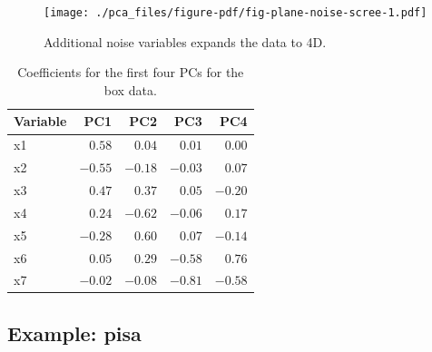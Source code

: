\documentclass[
  letterpaper,
]{book}
\newenvironment{Shaded}{\begin{snugshade}}{\end{snugshade}}
\newcommand{\AttributeTok}[1]{\textcolor[rgb]{0.40,0.45,0.13}{#1}}
\newcommand{\DecValTok}[1]{\textcolor[rgb]{0.68,0.00,0.00}{#1}}
\newcommand{\FunctionTok}[1]{\textcolor[rgb]{0.28,0.35,0.67}{#1}}
\newcommand{\NormalTok}[1]{\textcolor[rgb]{0.00,0.23,0.31}{#1}}
\newcommand{\SpecialCharTok}[1]{\textcolor[rgb]{0.37,0.37,0.37}{#1}}
\newcommand{\StringTok}[1]{\textcolor[rgb]{0.13,0.47,0.30}{#1}}
\begin{document}
\begin{figure}[H]

{\centering \texttt{[image: ./pca\_files/figure-pdf/fig-plane-noise-scree-1.pdf]}

}

\caption{\label{fig-plane-noise-scree}Additional noise variables expands
the data to 4D.}

\end{figure}

\begin{Shaded}
\end{Shaded}

\hypertarget{tbl-plane-noise-pcs}{}
\begin{longtable}{lrrrr}
\caption{\label{tbl-plane-noise-pcs}Coefficients for the first four PCs for the box data. }\tabularnewline

\toprule
Variable & PC1 & PC2 & PC3 & PC4 \\ 
\midrule
x1 & $0.58$ & $0.04$ & $0.01$ & $0.00$ \\ 
x2 & $-0.55$ & $-0.18$ & $-0.03$ & $0.07$ \\ 
x3 & $0.47$ & $0.37$ & $0.05$ & $-0.20$ \\ 
x4 & $0.24$ & $-0.62$ & $-0.06$ & $0.17$ \\ 
x5 & $-0.28$ & $0.60$ & $0.07$ & $-0.14$ \\ 
x6 & $0.05$ & $0.29$ & $-0.58$ & $0.76$ \\ 
x7 & $-0.02$ & $-0.08$ & $-0.81$ & $-0.58$ \\ 
\bottomrule
\end{longtable}

\hypertarget{example-pisa}{%
\subsection{Example: pisa}\label{example-pisa}}
\end{document}
